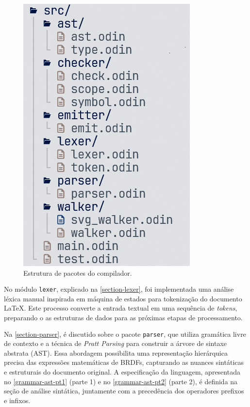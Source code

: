 \begin{figure}[!ht]
  \caption{\label{estrutura-de-pacotes} \small Estrutura de pacotes do compilador.}
  \begin{center}
    \includegraphics[scale=0.5]{./Imagens/package-structure.png}
  \end{center}
\end{figure}

No módulo \texttt{lexer}, explicado na \autoref{section-lexer}, foi implementada uma análise léxica manual inspirada em máquina de estados para tokenização do documento \LaTeX{}. Este processo converte a entrada textual em uma sequência de \textit{tokens}, preparando o as estruturas de dados para as próximas etapas de processamento.


Na \autoref{section-parser}, é discutido sobre o pacote \texttt{parser}, que utiliza gramática livre de contexto e a técnica de \textit{Pratt Parsing} para construir a árvore de sintaxe abstrata (AST). Essa abordagem possibilita uma representação hierárquica precisa das expressões matemáticas de BRDFs, capturando as nuances sintáticas e estruturais do documento original. A especificação da linguagem, apresentada no \autoref{grammar-ast-pt1} (parte 1) e no \autoref{grammar-ast-pt2} (parte 2), é definida na seção de análise sintática, juntamente com a precedência dos operadores prefixos e infixos.

